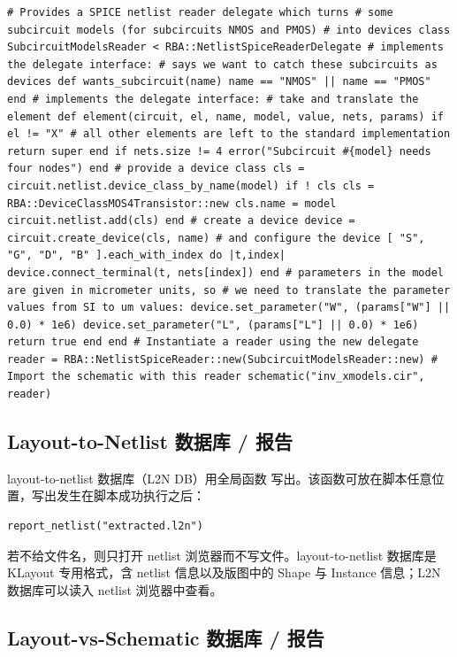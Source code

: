 \begin{lstlisting}
# Provides a SPICE netlist reader delegate which turns # some subcircuit models (for subcircuits NMOS and PMOS) # into devices class SubcircuitModelsReader < RBA::NetlistSpiceReaderDelegate # implements the delegate interface: # says we want to catch these subcircuits as devices def wants_subcircuit(name) name == "NMOS" || name == "PMOS" end # implements the delegate interface: # take and translate the element def element(circuit, el, name, model, value, nets, params) if el != "X" # all other elements are left to the standard implementation return super end if nets.size != 4 error("Subcircuit #{model} needs four nodes") end # provide a device class cls = circuit.netlist.device_class_by_name(model) if ! cls cls = RBA::DeviceClassMOS4Transistor::new cls.name = model circuit.netlist.add(cls) end # create a device device = circuit.create_device(cls, name) # and configure the device [ "S", "G", "D", "B" ].each_with_index do |t,index| device.connect_terminal(t, nets[index]) end # parameters in the model are given in micrometer units, so # we need to translate the parameter values from SI to um values: device.set_parameter("W", (params["W"] || 0.0) * 1e6) device.set_parameter("L", (params["L"] || 0.0) * 1e6) return true end end # Instantiate a reader using the new delegate reader = RBA::NetlistSpiceReader::new(SubcircuitModelsReader::new) # Import the schematic with this reader schematic("inv_xmodels.cir", reader)
\end{lstlisting}

\subsection{Layout-to-Netlist 数据库 / 报告}

layout-to-netlist 数据库（L2N DB）用全局函数  写出。该函数可放在脚本任意位置，写出发生在脚本成功执行之后：

\begin{lstlisting}
report_netlist("extracted.l2n")
\end{lstlisting}

若不给文件名，则只打开 netlist 浏览器而不写文件。layout-to-netlist 数据库是 KLayout 专用格式，含 netlist 信息以及版图中的 Shape 与 Instance 信息；L2N 数据库可以读入 netlist 浏览器中查看。

\subsection{Layout-vs-Schematic 数据库 / 报告}

